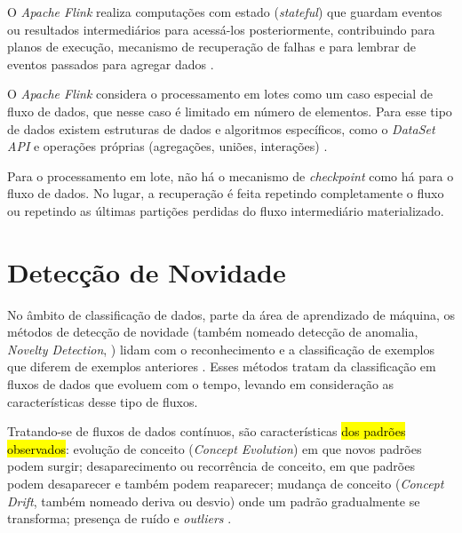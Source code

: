 O \emph{Apache Flink} realiza computações com estado (\emph{stateful}) que guardam
eventos ou resultados intermediários para acessá-los posteriormente,
contribuindo para planos de execução, mecanismo de recuperação de falhas e para
lembrar de eventos passados para agregar dados \cite{ApacheFlink2020, Carbone2015}.


O \emph{Apache Flink} considera o processamento em lotes como um caso especial
de fluxo de dados, que nesse caso é limitado em número de elementos.
Para esse tipo de dados existem estruturas de dados e algoritmos específicos, como o
\emph{DataSet API} e operações próprias (agregações, uniões, interações)
\cite{Carbone2015}.

Para o processamento em lote, não há o mecanismo de \emph{checkpoint} como há
para o fluxo de dados.
No lugar, a recuperação é feita repetindo completamente o fluxo ou repetindo as
últimas partições perdidas do fluxo intermediário materializado.

\section{Detecção de Novidade}\label{sec:nd}

\newcommand{\novelty}{\emph{Novelty Detection}\xspace}
\newcommand{\drift}{\emph{Concept Drift}\xspace}
\newcommand{\evolution}{\emph{Concept Evolution}\xspace}

No âmbito de classificação de dados, parte da área de aprendizado de máquina, os
métodos de detecção de novidade (também nomeado detecção de anomalia, \novelty,
\nd) lidam com o reconhecimento e a classificação de exemplos que diferem de
exemplos anteriores \cite{PERNER2007,Gama2010}.
Esses métodos tratam da classificação em fluxos de dados que evoluem com o
tempo, levando em consideração as características desse tipo de fluxos.


Tratando-se de fluxos de dados contínuos, são características
\hl{dos padrões observados}:
evolução de conceito (\evolution) em que novos padrões podem surgir;
desaparecimento ou recorrência de conceito, em que padrões podem desaparecer e
também podem reaparecer;
mudança de conceito (\drift, também nomeado deriva ou desvio) onde um padrão
gradualmente se transforma;
presença de ruído e \emph{outliers} \cite{Gama2010}.

